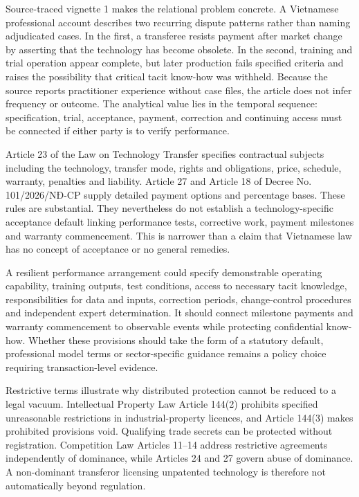 \documentclass[
]{article}
\begin{document}
Source-traced vignette 1 makes the relational problem concrete. A
Vietnamese professional account describes two recurring dispute patterns
rather than naming adjudicated cases. In the first, a transferee resists
payment after market change by asserting that the technology has become
obsolete. In the second, training and trial operation appear complete,
but later production fails specified criteria and raises the possibility
that critical tacit know-how was withheld. Because the source reports
practitioner experience without case files, the article does not infer
frequency or outcome. The analytical value lies in the temporal
sequence: specification, trial, acceptance, payment, correction and
continuing access must be connected if either party is to verify
performance.

Article 23 of the Law on Technology Transfer specifies contractual
subjects including the technology, transfer mode, rights and
obligations, price, schedule, warranty, penalties and liability. Article
27 and Article 18 of Decree No. 101/2026/NĐ-CP supply detailed payment
options and percentage bases. These rules are substantial. They
nevertheless do not establish a technology-specific acceptance default
linking performance tests, corrective work, payment milestones and
warranty commencement. This is narrower than a claim that Vietnamese law
has no concept of acceptance or no general remedies.

A resilient performance arrangement could specify demonstrable operating
capability, training outputs, test conditions, access to necessary tacit
knowledge, responsibilities for data and inputs, correction periods,
change-control procedures and independent expert determination. It
should connect milestone payments and warranty commencement to
observable events while protecting confidential know-how. Whether these
provisions should take the form of a statutory default, professional
model terms or sector-specific guidance remains a policy choice
requiring transaction-level evidence.

Restrictive terms illustrate why distributed protection cannot be
reduced to a legal vacuum. Intellectual Property Law Article 144(2)
prohibits specified unreasonable restrictions in industrial-property
licences, and Article 144(3) makes prohibited provisions void.
Qualifying trade secrets can be protected without registration.
Competition Law Articles 11--14 address restrictive agreements
independently of dominance, while Articles 24 and 27 govern abuse of
dominance. A non-dominant transferor licensing unpatented technology is
therefore not automatically beyond regulation.
\end{document}
